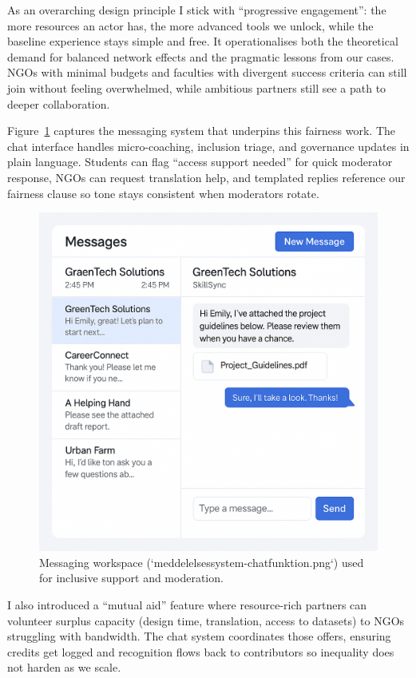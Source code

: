 As an overarching design principle I stick with ``progressive engagement'': the more resources an actor has, the more advanced tools we unlock, while the baseline experience stays simple and free. It operationalises both the theoretical demand for balanced network effects and the pragmatic lessons from our cases. NGOs with minimal budgets and faculties with divergent success criteria can still join without feeling overwhelmed, while ambitious partners still see a path to deeper collaboration.

Figure~\ref{fig:chat-system} captures the messaging system that underpins this fairness work. The chat interface handles micro-coaching, inclusion triage, and governance updates in plain language. Students can flag ``access support needed'' for quick moderator response, NGOs can request translation help, and templated replies reference our fairness clause so tone stays consistent when moderators rotate.

\begin{figure}[h]
  \centering
  \includegraphics[width=0.85\linewidth]{figures/opgave07/meddelelsessystem-chatfunktion.png}
  \caption{Messaging workspace (`meddelelsessystem-chatfunktion.png`) used for inclusive support and moderation.}
  \label{fig:chat-system}
\end{figure}

I also introduced a ``mutual aid'' feature where resource-rich partners can volunteer surplus capacity (design time, translation, access to datasets) to NGOs struggling with bandwidth. The chat system coordinates those offers, ensuring credits get logged and recognition flows back to contributors so inequality does not harden as we scale.
